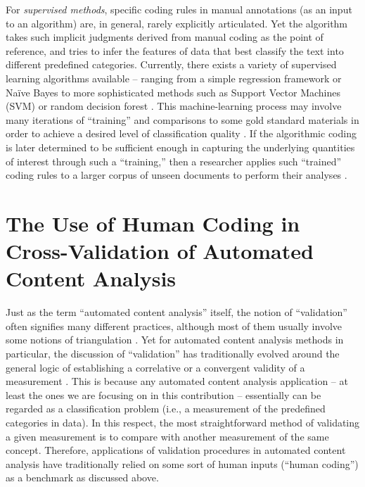 \documentclass[man, floatsintext, 12pt, a4paper, noextraspace]{apa6}
\begin{document}
    For \textit{supervised methods}, specific coding rules in manual annotations (as an input to an algorithm) are, in general, rarely explicitly articulated. Yet the algorithm takes such implicit judgments derived from manual coding as the point of reference, and tries to infer the features of data that best classify the text into different predefined categories. Currently, there exists a variety of supervised learning algorithms available -- ranging from a simple regression framework or Naïve Bayes to more sophisticated methods such as Support Vector Machines (SVM) or random decision forest \parencites[for an overview, see][]{hindman2015building}. This machine-learning process may involve many iterations of \enquote{training} and comparisons to some gold standard materials in order to achieve a desired level of classification quality \parencites[e.g.,][]{scharkow2013thematic}. If the algorithmic coding is later determined to be sufficient enough in capturing the underlying quantities of interest through such a \enquote{training,} then a researcher applies such \enquote{trained} coding rules to a larger corpus of unseen documents to perform their analyses \parencites[e.g.,][]{burscher2015using, burscher2014teaching, scharkow2013thematic, gonzalez2015signals}.    
    
 \section{The Use of Human Coding in Cross-Validation of Automated Content Analysis}
    
    Just as the term \enquote{automated content analysis} itself, the notion of \enquote{validation} often signifies many different practices, although most of them usually involve some notions of triangulation \parencites[e.g.,][]{Neunhoeffer2018}. Yet for automated content analysis methods in particular, the discussion of \enquote{validation} has traditionally evolved around the general logic of establishing a correlative or a convergent validity of a measurement \parencites[][]{Krippendorff2008validity}. This is because any automated content analysis application -- at least the ones we are focusing on in this contribution -- essentially can be regarded as a classification problem (i.e., a measurement of the predefined categories in data). In this respect, the most straightforward method of validating a given measurement is to compare with another measurement of the same concept. Therefore, applications of validation procedures in automated content analysis have traditionally relied on some sort of human inputs (“human coding”) as a benchmark as discussed above. 
    
\end{document}

